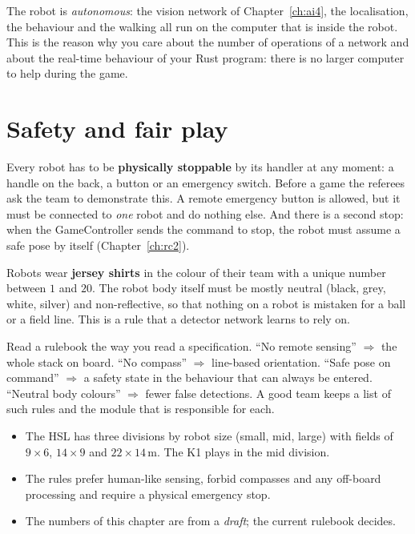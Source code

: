 \begin{keyidea}
The robot is \emph{autonomous}: the vision network of Chapter~\ref{ch:ai4}, the localisation, the behaviour and the walking all run on the computer that is inside the robot. This is the reason why you care about the number of operations of a network and about the real-time behaviour of your Rust program: there is no larger computer to help during the game.
\end{keyidea}

\section*{Safety and fair play}
Every robot has to be \textbf{physically stoppable} by its handler at any moment: a handle on the back, a button or an emergency switch. Before a game the referees ask the team to demonstrate this. A remote emergency button is allowed, but it must be connected to \emph{one} robot and do nothing else. And there is a second stop: when the GameController sends the command to stop, the robot must assume a safe pose by itself (Chapter~\ref{ch:rc2}).

Robots wear \textbf{jersey shirts} in the colour of their team with a unique number between $1$ and $20$. The robot body itself must be mostly neutral (black, grey, white, silver) and non-reflective, so that nothing on a robot is mistaken for a ball or a field line. This is a rule that a detector network learns to rely on.

\begin{aibox}
Read a rulebook the way you read a specification. ``No remote sensing'' $\Rightarrow$ the whole stack on board. ``No compass'' $\Rightarrow$ line-based orientation. ``Safe pose on command'' $\Rightarrow$ a safety state in the behaviour that can always be entered. ``Neutral body colours'' $\Rightarrow$ fewer false detections. A good team keeps a list of such rules and the module that is responsible for each.
\end{aibox}

\begin{keyidea}[Summary]
\begin{itemize}[nosep]
 \item The HSL has three divisions by robot size (small, mid, large) with fields of $9\times6$, $14\times9$ and $22\times14$\,m. The K1 plays in the mid division.
 \item The rules prefer human-like sensing, forbid compasses and any off-board processing and require a physical emergency stop.
 \item The numbers of this chapter are from a \emph{draft}; the current rulebook decides.
\end{itemize}
\end{keyidea}

